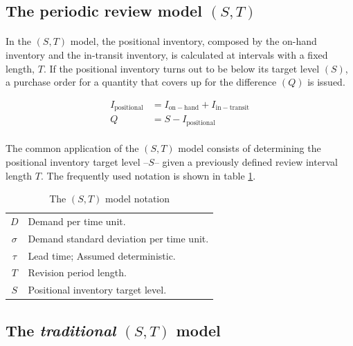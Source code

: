 \documentclass[letterpaper]{article}
\begin{document}
\subsection*{The periodic review model $(S,T)$}
\paragraph{}
In the $(S,T)$ model, the positional inventory, composed by the on-hand inventory and the in-transit inventory, is calculated at intervals with a fixed length, $T$. If the positional inventory turns out to be below its target level $(S)$, a purchase order for a quantity that covers up for the difference $(Q)$ is issued. 

\begin{align}
    I_\mathrm{positional}  &= I_\mathrm{on-hand} + I_\mathrm{in-transit} \\
    Q &= S - I_\mathrm{positional}
\end{align}

\paragraph{}
The common application of the $(S,T)$ model consists of determining the positional inventory target level --$S$-- given a previously defined review interval length $T$. The frequently used notation is shown in table \ref{tab:reg_ST_notation}.

\begin{table}[!h]
    \begin{center}
        \begin{tabular}{c|l}
            \toprule
            $D$ & Demand per time unit. \\
            $\sigma$ & Demand standard deviation per time unit.\\
            $\tau$ & Lead time; Assumed deterministic. \\
            $T$ & Revision period length. \\
            $S$ & Positional inventory target level. \\
            \bottomrule
        \end{tabular}
    \end{center}
    \caption{The $(S,T)$ model notation}
    \label{tab:reg_ST_notation}
\end{table}


\subsection*{The \textit{traditional} $(S,T)$ model}
\end{document}

